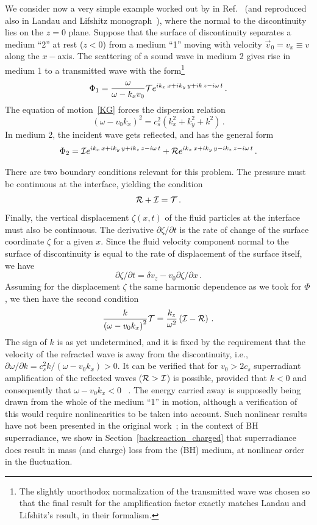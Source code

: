 \documentclass[11pt]{article}
\newcommand{\be}{\begin{equation}}
\newcommand{\ee}{\end{equation}}
\numberwithin{equation}{section} %
\begin{document}
We consider now a very simple example worked out by in Ref.~\cite{Ribner:1957} (and reproduced also in Landau and Lifshitz monograph~\cite{Landau:book_fluids}), where the normal to the discontinuity lies on the $z=0$ plane. Suppose that the surface of discontinuity separates a medium ``2'' at rest ($z<0$) from a medium ``1'' moving with velocity $\vec{v}_0=v_x\equiv v$ along the $x-$axis.
The scattering of a sound wave in medium 2 gives rise in medium 1 to a transmitted wave with the form\footnote{The slightly unorthodox normalization of the transmitted wave was chosen so that the final result for the amplification factor exactly matches Landau and Lifshitz's result, in their formalism.}
%
\be
\Phi_1=\frac{\omega}{\omega-k_x v_0}{\cal T}e^{ik_x\,x+ik_y\,y+ik\,z-i\omega\,t}\,.
\ee
%
The equation of motion~\eqref{KG} forces the dispersion relation
%
\be
(\omega-v_0 k_x)^2=c_s^2(k_x^2+k_y^2+k^2)\,.
\ee
%
In medium 2, the incident wave gets reflected, and has the general form
%
\be
\Phi_2={\cal I} e^{ik_x\,x+ik_y\,y+ik_z\,z-i\omega\,t}+{\cal R}e^{ik_x\,x+ik_y\,y-ik_z\,z-i\omega\,t}\,.
\ee
%


There are two boundary conditions relevant for this problem. The pressure must be continuous at the interface, yielding the condition
%
\be
{\cal R}+{\cal I}={\cal T}\,.
\ee
%
Finally, the vertical displacement $\zeta(x,t)$ of the fluid particles at the interface must also be continuous.
The derivative $\partial \zeta/\partial t$ is the rate of change of the surface coordinate $\zeta$ for a given $x$.
Since the fluid velocity component normal to the surface of discontinuity is equal to the rate of displacement of the surface itself, we have
%
\be
\partial \zeta/\partial t=\delta v_z-v_0\partial \zeta/\partial x\,.
\ee
%
Assuming for the displacement $\zeta$ the same harmonic dependence as we took for $\Phi$, we then have the second condition
%
\be
\frac{k}{\left(\omega-v_0k_x\right)^2}{\cal T}=\frac{k_z}{\omega^2}\left({\cal I}-{\cal R}\right)\,.
\ee
%
The sign of $k$ is as yet undetermined, and it is fixed by the requirement that the velocity of the refracted wave is away from the discontinuity, i.e., $\partial\omega/\partial k=c_s^2k/(\omega-v_0k_x)>0$. It can be verified that for $v_0>2c_s$ superradiant amplification of the reflected waves (${\cal R}>{\cal I}$) is possible, provided that $k<0$ and consequently that $\omega-v_0k_x<0$ ~\cite{Ribner:1957,Landau:book_fluids}. The energy carried away is supposedly being drawn from the whole of the medium ``1'' in motion, although a verification of this would require nonlinearities to be taken into account. Such nonlinear results have not been presented in the original work~\cite{Ribner:1957,Landau:book_fluids}; in the context of BH superradiance, we show in Section~\ref{backreaction_charged} that superradiance does result in mass (and charge) loss 
from the (BH) medium, at nonlinear order in the fluctuation.
\end{document}
